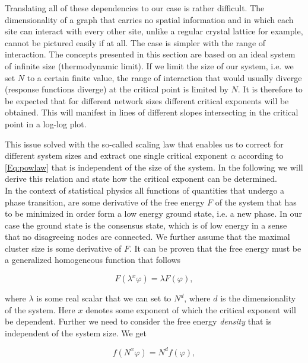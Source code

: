 \documentclass[11pt]{article}
\begin{document}
Translating all of these dependencies to our case is rather difficult. The dimensionality of a graph that carries no spatial information and in which each site can interact with every other site, unlike a regular crystal lattice for example, cannot be pictured easily if at all. The case is simpler with the range of interaction. The concepts presented in this section are based on an ideal system of infinite size (thermodynamic limit). If we limit the size of our system, i.e. we set $N$ to a certain finite value, the range of interaction that would usually diverge (response functions diverge) at the critical point is limited by $N$. It is therefore to be expected that for different network sizes different critical exponents will be obtained. This will manifest in lines of different slopes intersecting in the critical point in a log-log plot.

This issue solved with the so-called scaling law that enables us to correct for different system sizes and extract one single critical exponent $\alpha$ according to \eqref{Eq:powlaw} that is independent of the size of the system. In the following we will derive this relation and state how the critical exponent can be determined.\\


In the context of statistical physics all functions of quantities that undergo a phase transition, are some derivative of the free energy $F$ of the system that has to be minimized in order form a low energy ground state, i.e. a new phase. In our case the ground state is the consensus state, which is of low energy in a sense that no disagreeing nodes are connected. We further assume that the maximal cluster size is some derivative of $F$. It can be proven that the free energy must be a generalized homogeneous function that follows

\begin{equation}
F(\lambda^x \varphi) = \lambda F(\varphi),
\end{equation}

where $\lambda$ is some real scalar that we can set to $N^d$, where $d$ is the dimensionality of the system. Here $x$ denotes some exponent of which the critical exponent will be dependent. Further we need to consider the free energy \textit{density} that is independent of the system size. We get

\begin{equation}
f(N^x \varphi) = N^d f(\varphi),
\end{equation}
\end{document}

